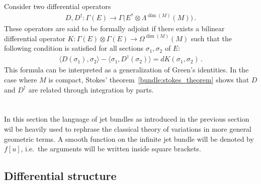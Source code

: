     \begin{property}\label{var:formal_adjoint}
        Consider two differential operators
        \begin{gather}
            D,D^\dagger:\Gamma(E)\rightarrow\Gamma\bigl(E^*\otimes\Lambda^{\dim(M)}(M)\bigr)\,.
        \end{gather}
        These operators are said to be formally adjoint if there exists a bilinear differential operator $K:\Gamma(E)\otimes\Gamma(E)\rightarrow\Omega^{\dim(M)}(M)$ such that the following condition is satisfied for all sections $\sigma_1,\sigma_2$ of $E$:
        \begin{gather}
            \langle D(\sigma_1),\sigma_2 \rangle - \langle\sigma_1,D^\dagger(\sigma_2)\rangle = dK(\sigma_1,\sigma_2)\,.
        \end{gather}
        This formula can be interpreted as a generalization of Green's identities. In the case where $M$ is compact, Stokes' theorem~\ref{bundle:stokes_theorem} shows that $D$ and $D^\dagger$ are related through integration by parts.
    \end{property}


\section{}\label{section:variational_bicomplex}

    In this section the language of jet bundles as introduced in the previous section wil be heavily used to rephrase the classical theory of variations in more general geometric terms. A smooth function on the infinite jet bundle will be denoted by $f[u]$, i.e.~the arguments will be written inside square brackets.

\subsection{Differential structure}


